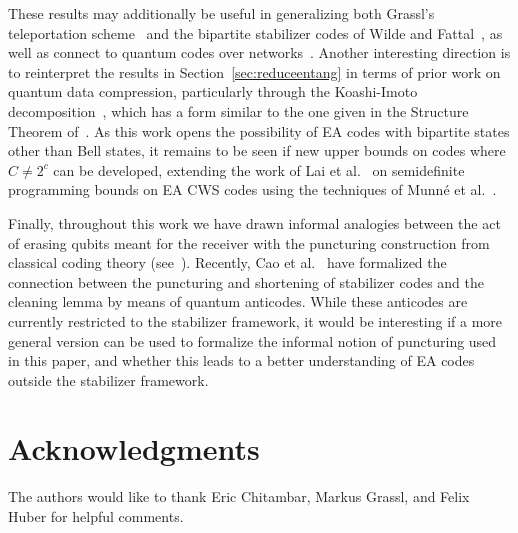 \documentclass[]{amsart}
\begin{document}
These results may additionally be useful in generalizing both Grassl's teleportation scheme~\cite{Gra2021} and the bipartite stabilizer codes of Wilde and Fattal~\cite{WF2010}, as well as connect to quantum codes over networks~\cite{YM2018,SYM2024}.
Another interesting direction is to reinterpret the results in Section~\ref{sec:reduceentang} in terms of prior work on quantum data compression, particularly through the Koashi-Imoto decomposition~\cite{KI2002,HJPW2004}, which has a form similar to the one given in the Structure Theorem of~\cite{CHKNN2025}.
As this work opens the possibility of EA codes with bipartite states other than Bell states, it remains to be seen if new upper bounds on codes where $C\neq2^c$ can be developed, extending the work of Lai et al.~\cite{LTY2024} on semidefinite programming bounds on EA CWS codes using the techniques of Munn{\'e} et al.~\cite{MNH2024}.

Finally, throughout this work we have drawn informal analogies between the act of erasing qubits meant for the receiver with the puncturing construction from classical coding theory (see~\cite[Section 1.5]{HP2003}).
Recently, Cao et al.~\cite{CCL2025} have formalized the connection between the puncturing and shortening of stabilizer codes and the cleaning lemma by means of quantum anticodes.
While these anticodes are currently restricted to the stabilizer framework, it would be interesting if a more general version can be used to formalize the informal notion of puncturing used in this paper, and whether this leads to a better understanding of EA codes outside the stabilizer framework.

\section*{Acknowledgments}

The authors would like to thank Eric Chitambar, Markus Grassl, and Felix Huber for helpful comments.

% 
% 
\end{document}
